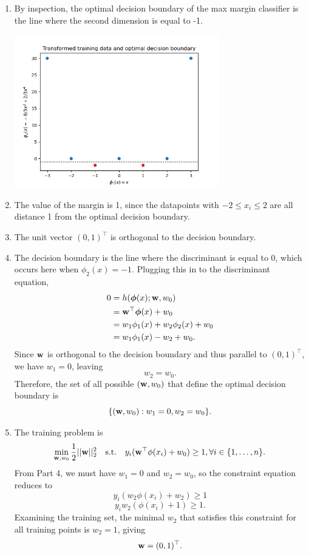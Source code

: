 \documentclass[submit]{harvardml}
\begin{document}
\begin{enumerate}
	\item By inspection, the optimal decision boundary of the max margin classifier is the line where the second dimension is equal to -1.
	
	\begin{center}
		\includegraphics[width=0.7\textwidth]{SVM}
	\end{center}
	
	\item The value of the margin is 1, since the datapoints with $-2 \leq x_i \leq 2$ are all distance 1 from the optimal decision boundary.
	
	\item The unit vector
	$(0, 1)^\top$
	is orthogonal to the decision boundary.
	
	\item The decision boundary is the line where the discriminant is equal to 0, which occurs here when $\phi_2(x) = -1$. Plugging this in to the discriminant equation,
	\begin{align*}
		0 &= h(\boldsymbol{\phi}(x);\mathbf{w},w_0) \\
		&= \mathbf{w}^\top\boldsymbol{\phi}(x) +w_0 \\
		&= w_1\phi_1(x) + w_2\phi_2(x) + w_0 \\
		&= w_1\phi_1(x) - w_2 + w_0.
	\end{align*}
	Since $\mathbf{w}$ is orthogonal to the decision boundary and thus parallel to $(0, 1)^\top$, we have $w_1 = 0$, leaving
	$$w_2 = w_0.$$
	Therefore, the set of all possible $(\mathbf{w}, w_0)$ that define the optimal decision boundary is
	$$\{(\mathbf{w}, w_0) : w_1 = 0, w_2 = w_0\}.$$

	\item The training problem is
	$$\min_{\mathbf{w}, w_0} \frac12||\mathbf{w}||_2^2 \quad \text{s.t.} \quad y_i(\mathbf{w}^\top\phi(x_i) + w_0) \geq 1, \forall i \in \{1, \ldots, n\}.$$
	From Part 4, we must have $w_1 = 0$ and $w_2 = w_0$, so the constraint equation reduces to
	$$y_i(w_2\phi(x_i) + w_2) \geq 1$$
	$$y_iw_2(\phi(x_i) + 1) \geq 1.$$
	Examining the training set, the minimal $w_2$ that satisfies this constraint for all training points is $w_2 = 1$, giving
	$$\mathbf{w} = (0, 1)^\top.$$
	

\end{enumerate}
\end{document}
